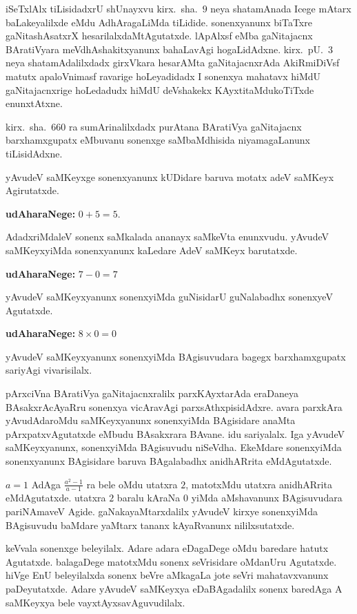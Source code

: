 iSeTxlAlx tiLisidadxrU shUnayxvu kirx.~sha.\ $9$ neya shatamAnada Icege mAtarx baLakeyalilxde eMdu AdhAragaLiMda tiLidide. sonenxyanunx biTaTxre gaNitashAsatxrX hesarilalx\-daMtAgutatxde. lApAlxsf eMba gaNitajacnx BAratiVyara meVdhAshakitxyanunx bahaLavAgi hogaLidAdxne. kirx.~pU.\ $3$ neya shatamAdalilxdadx girxVkara hesarAMta gaNitajacnxrAda AkiRmiDiVsf matutx apaloVnimasf ravarige hoLeyadidadx  I sonenxya mahatavx hiMdU \-gaNitajacnxrige hoLedadudx hiMdU deVshakekx KAyxtitaMdukoTiTxde enunxtAtxne.

kirx.~sha.\ $660$ ra sumArinalilxdadx purAtana BAratiVya gaNitajacnx barxhamxgupatx eMbuvanu sonenxge saMbaMdhisida niyamagaLanunx tiLisidAdxne.

yAvudeV saMKeyxge sonenxyanunx kUDidare baruva motatx adeV saMKeyx Agirutatxde. 

\textbf{udAharaNege:} $0+5=5$.

AdadxriMdaleV sonenx saMkalada ananayx saMkeVta enunxvudu.
yAvudeV saMKeyxyiMda sonenxyanunx kaLedare AdeV saMKeyx barutatxde.

\textbf{udAharaNege:} $7-0=7$

yAvudeV saMKeyxyanunx sonenxyiMda guNisidarU guNalabadhx sonenxyeV Agutatxde. 

\textbf{udAharaNege:} $8\times 0 = 0$

yAvudeV saMKeyxyanunx sonenxyiMda BAgisuvudara bagegx barxhamxgupatx sariyAgi vivarisilalx.

pArxciVna BAratiVya gaNitajacnxralilx parxKAyxtarAda eraDaneya BAsakxrAcAyaRru sonenxya vicAravAgi parxsAthxpisidAdxre. avara parxkAra yAvudAdaroMdu saMKeyx\-yanunx sonenxyiMda BAgisidare anaMta pArxpatxvAgutatxde eMbudu BAsakxrara BAvane. idu sariyalalx. Iga yAvudeV saMKeyxyanunx, sonenxyiMda BAgisuvudu niSeVdha. EkeMdare sonenxyiMda sonenxyanunx BAgisidare baruva BAgalabadhx anidhARrita 
eMdAgutatxde.

$a=1$ AdAga $\frac{a^2-1}{a-1}$ ra bele oMdu utatxra $2$, matotxMdu utatxra anidhARrita eMdAgutatxde. utatxra $2$ baralu kAraNa $0$ yiMda aMshavanunx BAgisuvudara pariNA\-maveV Agide. gaNakayaMtarxdalilx yAvudeV kirxye sonenxyiMda BAgisuvudu baMdare yaMtarx tananx kAyaRvanunx nililxsutatxde.

keVvala sonenxge beleyilalx. Adare adara eDagaDege oMdu baredare hatutx Agutatxde. balagaDege matotxMdu sonenx seVrisidare oMdanUru Agutatxde. hiVge EnU beleyilalxda sonenx beVre aMkagaLa jote seVri mahatavxvanunx paDeyutatxde. Adare yAvudeV saMKeyxya eDaBAgadalilx sonenx baredAga A saMKeyxya bele vayxtAyxsavAguvudilalx. 


